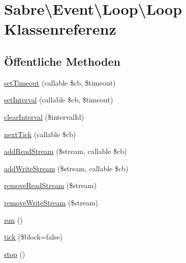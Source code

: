 \hypertarget{class_sabre_1_1_event_1_1_loop_1_1_loop}{}\section{Sabre\textbackslash{}Event\textbackslash{}Loop\textbackslash{}Loop Klassenreferenz}
\label{class_sabre_1_1_event_1_1_loop_1_1_loop}
\subsection*{Öffentliche Methoden}
\begin{DoxyCompactItemize}
\item 
\mbox{\hyperlink{class_sabre_1_1_event_1_1_loop_1_1_loop_a6b333de79a4c2db471ce2fe2144d351c}{set\+Timeout}} (callable \$cb, \$timeout)
\item 
\mbox{\hyperlink{class_sabre_1_1_event_1_1_loop_1_1_loop_a0dced1006c02c2923492f711efd77667}{set\+Interval}} (callable \$cb, \$timeout)
\item 
\mbox{\hyperlink{class_sabre_1_1_event_1_1_loop_1_1_loop_a688063f34dc5f12a4a6d25e529644563}{clear\+Interval}} (\$interval\+Id)
\item 
\mbox{\hyperlink{class_sabre_1_1_event_1_1_loop_1_1_loop_aa0f81262bf1101bba12dbe6abde5bb6b}{next\+Tick}} (callable \$cb)
\item 
\mbox{\hyperlink{class_sabre_1_1_event_1_1_loop_1_1_loop_af2a360be696de46a5685a0b4a3d754aa}{add\+Read\+Stream}} (\$stream, callable \$cb)
\item 
\mbox{\hyperlink{class_sabre_1_1_event_1_1_loop_1_1_loop_aa914653c243a74d75a50bd6c97d252b9}{add\+Write\+Stream}} (\$stream, callable \$cb)
\item 
\mbox{\hyperlink{class_sabre_1_1_event_1_1_loop_1_1_loop_a2eb117cbdc18fcdbbfe595bab3b24fc3}{remove\+Read\+Stream}} (\$stream)
\item 
\mbox{\hyperlink{class_sabre_1_1_event_1_1_loop_1_1_loop_a95eed71fade8365671ee032a6f70253a}{remove\+Write\+Stream}} (\$stream)
\item 
\mbox{\hyperlink{class_sabre_1_1_event_1_1_loop_1_1_loop_a78cbef0bbe4c97ae0d1f63dbbeb2a066}{run}} ()
\item 
\mbox{\hyperlink{class_sabre_1_1_event_1_1_loop_1_1_loop_a6eda85416ced852119a02beaf25a3b87}{tick}} (\$block=false)
\item 
\mbox{\hyperlink{class_sabre_1_1_event_1_1_loop_1_1_loop_acba1cc3bebed99530f33dcb2fce9b024}{stop}} ()
\end{DoxyCompactItemize}
